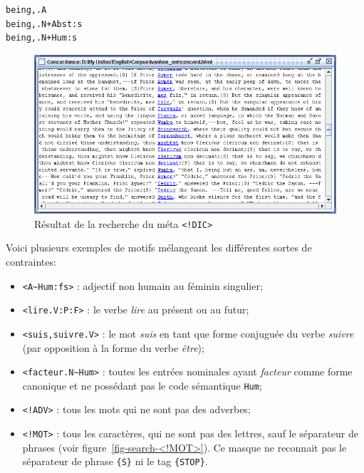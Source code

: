 \begin{verbatim}
being,.A
being,.N+Abst:s
being,.N+Hum:s
\end{verbatim}

\bigskip
\begin{figure}[h]
\begin{center}
\includegraphics[width=15cm]{resources/img/fig4-1.png}
\caption{Résultat de la recherche du méta \texttt{<!DIC>}}
\end{center}
\end{figure}

\bigskip
\noindent Voici plusieurs exemples de motifs mélangeant les différentes sortes de contraintes:

\begin{itemize}
  \item \verb$<A~Hum:fs>$ : adjectif non humain au féminin singulier;
  \item \verb+<lire.V:P:F>+ : le verbe \textit{lire} au présent ou au futur;
  \item \verb$<suis,suivre.V>$ : le mot \textit{suis} en tant que forme conjuguée du verbe
  	  \textit{suivre}
  	  (par opposition à la forme du verbe \textit{être});
  \item \verb$<facteur.N~Hum>$ : toutes les entrées nominales ayant \textit{facteur} comme forme
  	  canonique et ne possédant pas le code sémantique \verb+Hum+;
  \item \verb$<!ADV>$ : tous les mots qui ne sont pas des adverbes;
  \item \verb$<!MOT>$ : tous les caractères, qui ne sont pas des lettres, sauf le séparateur de
  	  phrases
  	  (voir figure~\ref{fig-search-<!MOT>}). Ce masque ne reconnait pas le séparateur de phrase
  	  \verb+{S}+
  	  ni le tag \verb+{STOP}+.
\end{itemize}

